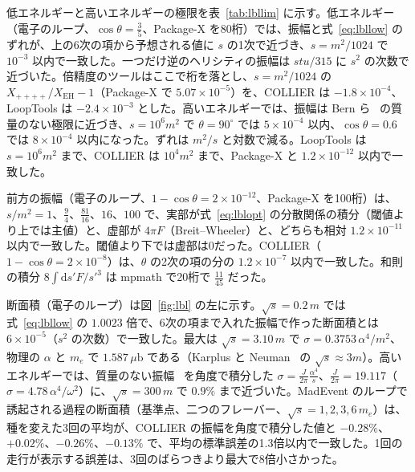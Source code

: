 \documentclass[a4paper,10pt]{ltjsarticle}
\newcommand{\dd}{\mathrm{d}}
\begin{document}
低エネルギーと高いエネルギーの極限を表~\ref{tab:lbllim} に示す。低エネルギー（電子のループ、$\cos\theta=\frac35$、Package-X を80桁）では、振幅と式~\eqref{eq:lbllow} のずれが、上の6次の項から予想される値に $s$ の1次で近づき、$s=m^2/1024$ で $10^{-3}$ 以内で一致した。一つだけ逆のヘリシティの振幅は $stu/315$ に $s^2$ の次数で近づいた。倍精度のツールはここで桁を落とし、$s=m^2/1024$ の $X_{++++}/X_{\mathrm{EH}}-1$（Package-X で $5.07\times10^{-5}$）を、COLLIER は $-1.8\times10^{-4}$、LoopTools は $-2.4\times10^{-3}$ とした。高いエネルギーでは、振幅は Bern ら~\cite{bern01} の質量のない極限に近づき、$s=10^6m^2$ で $\theta=90^\circ$ では $5\times10^{-4}$ 以内、$\cos\theta=0.6$ では $8\times10^{-4}$ 以内になった。ずれは $m^2/s$ と対数で減る。LoopTools は $s=10^6m^2$ まで、COLLIER は $10^4m^2$ まで、Package-X と $1.2\times10^{-12}$ 以内で一致した。

前方の振幅（電子のループ、$1-\cos\theta=2\times10^{-12}$、Package-X を100桁）は、$s/m^2=1$、$\frac94$、$\frac{81}{16}$、$16$、$100$ で、実部が式~\eqref{eq:lblopt} の分散関係の積分（閾値より上では主値）と、虚部が $4\pi F$（Breit--Wheeler）と、どちらも相対 $1.2\times10^{-11}$ 以内で一致した。閾値より下では虚部は0だった。COLLIER（$1-\cos\theta=2\times10^{-8}$）は、$\theta$ の2次の項の分の $1.2\times10^{-7}$ 以内で一致した。和則の積分 $8\int\dd s'F/s'^3$ は mpmath で20桁で $\frac{11}{45}$ だった。

断面積（電子のループ）は図~\ref{fig:lbl} の左に示す。$\sqrt s=0.2\,m$ では式~\eqref{eq:lbllow} の $1.0023$ 倍で、6次の項まで入れた振幅で作った断面積とは $6\times10^{-5}$（$s^2$ の次数）で一致した。最大は $\sqrt s=3.10\,m$ で $\sigma=0.3753\,\alpha^4/m^2$、物理の $\alpha$ と $m_e$ で $1.587\,\mu\mathrm b$ である（Karplus と Neuman~\cite{kn51} の $\sqrt s\approx3m$）。高いエネルギーでは、質量のない振幅~\cite{bern01} を角度で積分した $\sigma=\frac{J}{2\pi}\frac{\alpha^4}{s}$、$\frac{J}{2\pi}=19.117$（$\sigma=4.78\,\alpha^4/\omega^2$）に、$\sqrt s=300\,m$ で $0.9\%$ まで近づいた。MadEvent のループで誘起される過程の断面積（基準点、二つのフレーバー、$\sqrt s=1,2,3,6\,m_e$）は、種を変えた3回の平均が、COLLIER の振幅を角度で積分した値と $-0.28\%$、$+0.02\%$、$-0.26\%$、$-0.13\%$ で、平均の標準誤差の1.3倍以内で一致した。1回の走行が表示する誤差は、3回のばらつきより最大で8倍小さかった。
\end{document}
